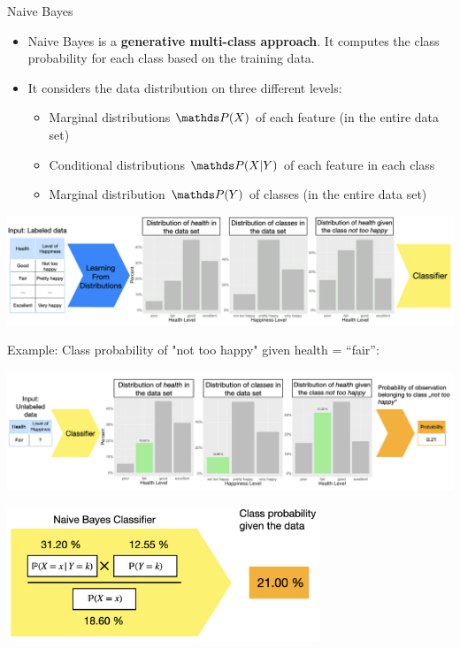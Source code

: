 \documentclass[11pt,compress,t,notes=noshow, xcolor=table]{beamer}
\begin{document}

\begin{vbframe}{Naive Bayes}
\begin{itemize}
\item \small Naive Bayes is a \textbf{generative multi-class approach}. It computes the class probability for each class based on the training data.
\item \small It considers the data distribution on three different levels:
    \begin{itemize}
    \item \small Marginal distributions $\P(X)$ of each feature (in the entire data set)
    \item \small Conditional distributions $\P(X|Y)$ of each feature in each class
    \item \small Marginal distribution $\P(Y)$ of classes (in the entire data set)
    \end{itemize}
\vspace*{1cm}
\end{itemize}
\begin{center}
  \includegraphics[width=1\textwidth]{figure_man/nutshell-classif-distributions_learning}
\end{center}

\newpage
\small Example: Class probability of "not too happy" given health = ``fair'':
\begin{center}
  \includegraphics[width=1\textwidth]{figure_man/nutshell-classif-distributions-prediction}
\end{center}
\begin{center}
  \includegraphics[width=0.7\textwidth]{figure_man/nutshell-classif-naive-bayes-formula}
\end{center}






\end{vbframe}
\end{document}
